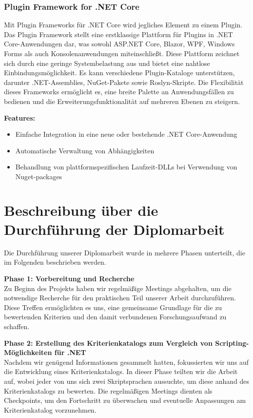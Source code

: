 \subsubsection*{Plugin Framework for .NET Core}

Mit Plugin Frameworks für .NET Core wird jegliches Element zu einem Plugin. Das Plugin 
Framework stellt eine erstklassige Plattform für Plugins in .NET Core-Anwendungen dar, was 
sowohl ASP.NET Core, Blazor, WPF, Windows Forms als auch Konsolenanwendungen miteinschließt. 
Diese Plattform zeichnet sich durch eine geringe Systembelastung aus und bietet eine nahtlose 
Einbindungsmöglichkeit. Es kann verschiedene Plugin-Kataloge unterstützen, 
darunter .NET-Assemblies, NuGet-Pakete sowie Roslyn-Skripte. 
Die Flexibilität dieses Frameworks ermöglicht es, eine breite Palette an Anwendungsfällen 
zu bedienen und die Erweiterungsfunktionalität auf mehreren Ebenen zu steigern.

\textbf{Features:}
\begin{itemize}
    \item Einfache Integration in eine neue oder bestehende .NET Core-Anwendung
    \item Automatische Verwaltung von Abhängigkeiten
    \item Behandlung von plattformspezifischen Laufzeit-DLLs bei Verwendung von Nuget-packages
\end{itemize}

\newpage
\section{Beschreibung über die Durchführung der Diplomarbeit}

Die Durchführung unserer Diplomarbeit wurde in mehrere Phasen unterteilt, 
die im Folgenden beschrieben werden.

\textbf{Phase 1: Vorbereitung und Recherche}\\
Zu Beginn des Projekts haben wir regelmäßige Meetings abgehalten, um die notwendige 
Recherche für den praktischen Teil unserer Arbeit durchzuführen. Diese Treffen 
ermöglichten es uns, eine gemeinsame Grundlage für die zu bewertenden Kriterien und 
den damit verbundenen Forschungsaufwand zu schaffen.

\textbf{Phase 2: Erstellung des Kriterienkatalogs zum Vergleich von Scripting-Möglichkeiten für .NET}\\
Nachdem wir genügend Informationen gesammelt hatten, fokussierten wir uns auf 
die Entwicklung eines Kriterienkatalogs. In dieser Phase teilten wir die Arbeit auf, 
wobei jeder von uns sich zwei Skriptsprachen aussuchte, um diese anhand des 
Kriterienkatalogs zu bewerten. Die regelmäßigen Meetings dienten als Checkpoints, 
um den Fortschritt zu überwachen und eventuelle Anpassungen am Kriterienkatalog vorzunehmen.

